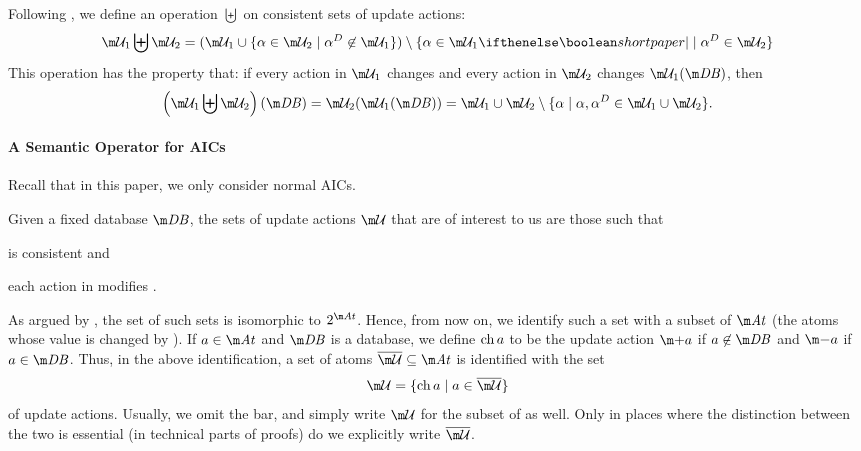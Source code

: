 
Following \citet{iclp/Cruz-Filipe16}, we define an operation $\biguplus$ on consistent sets of update actions: 
\[
\UU_1 \biguplus \UU_2 = (\UU_1 \cup \{\alpha \in \UU_2 \mid \alpha^D\not \in \UU_1 \}) \setminus \{\alpha\in \UU_1 \shortpaper{{\mid}}\mid \alpha^D\in \UU_2\}
\]
This operation has the property that: if every action in $\UU_1$ changes \db and every action in $\UU_2$ changes $\UU_1(\db)$, then 
\[\left(\UU_1\biguplus \UU_2\right)(\db) = \UU_2(\UU_1(\db))
= \UU_1\cup \UU_2 \setminus \{\alpha \mid \alpha,\alpha^D\in \UU_1\cup\UU_2\}.\]

\paragraph{A Semantic Operator for AICs}
Recall that in this paper, we only consider normal AICs.

Given a fixed database $\db$,
the sets of update actions $\UU$ that are of interest to us are those such that 
\begin{inparaenum}
\item \UU is consistent and 
\item each action in \UU modifies \db.
\end{inparaenum}
As argued by  \citet{iclp/Cruz-Filipe16}, the set of such sets is isomorphic to $2^{\atoms}$. Hence, from now on, we identify such a set with a subset of $\atoms$ (the atoms whose value is changed by \UU). 
If $a\in \atoms$ and $\db$ is a database, we define $\operatorname{ch} a$ to be the update action $\add a$ if $a\not\in \db$ and $\remove a$ if $a \in \db$. 
Thus, in the above identification, a set  of atoms $\overline\UU\subseteq \atoms$ is identified with the set 
\[\UU = \{\change a\mid a \in \overline \UU \}\]
of update actions.
Usually, we omit the bar, and simply write $\UU$ for the subset of \atoms as well.
Only in places where the distinction between the two is essential (in technical parts of proofs) do we explicitly write $\overline \UU$.

